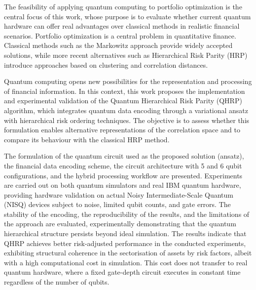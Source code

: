 The feasibility of applying quantum computing to portfolio optimization is the central focus of this work, whose purpose is to evaluate whether current quantum hardware can offer real advantages over classical methods in realistic financial scenarios. Portfolio optimization is a central problem in quantitative finance. Classical methods such as the Markowitz approach provide widely accepted solutions, while more recent alternatives such as Hierarchical Risk Parity (HRP) introduce approaches based on clustering and correlation distances.

Quantum computing opens new possibilities for the representation and processing of financial information. In this context, this work proposes the implementation and experimental validation of the Quantum Hierarchical Risk Parity (QHRP) algorithm, which integrates quantum data encoding through a variational ansatz with hierarchical risk ordering techniques. The objective is to assess whether this formulation enables alternative representations of the correlation space and to compare its behaviour with the classical HRP method.

The formulation of the quantum circuit used as the proposed solution (ansatz), the financial data encoding scheme, the circuit architecture with 5 and 6 qubit configurations, and the hybrid processing workflow are presented. Experiments are carried out on both quantum simulators and real IBM quantum hardware, providing hardware validation on actual Noisy Intermediate-Scale Quantum (NISQ) devices subject to noise, limited qubit counts, and gate errors. The stability of the encoding, the reproducibility of the results, and the limitations of the approach are evaluated, experimentally demonstrating that the quantum hierarchical structure persists beyond ideal simulation. The results indicate that QHRP achieves better risk-adjusted performance in the conducted experiments, exhibiting structural coherence in the sectorisation of assets by risk factors, albeit with a high computational cost in simulation. This cost does not transfer to real quantum hardware, where a fixed gate-depth circuit executes in constant time regardless of the number of qubits.

